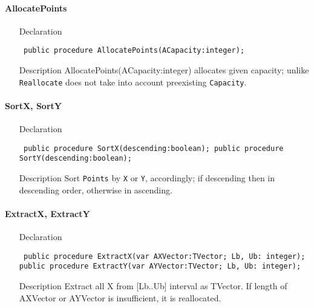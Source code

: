 \documentclass[12pt,a4paper,oneside]{report}
\newcommand{\declarationitem}[1]{{\addfontfeatures{FakeBold=1.3} #1}}
\newcommand{\descriptiontitle}[1]{{\addfontfeatures{FakeSlant}#1}}
\newcommand{\code}[1]{\texttt{#1}}
\begin{document}
\paragraph{AllocatePoints}\hspace*{\fill}

\label{lmPointsVec.TPoints-AllocatePoints}
\begin{itemize}\item[\declarationitem{Declaration}\hfill]
	\begin{flushleft}
		\code{
			public procedure AllocatePoints(ACapacity:integer);}
		
	\end{flushleft}
	
	\par
	\item[\descriptiontitle{Description}]
	AllocatePoints(ACapacity:integer) allocates given capacity; unlike \code{Reallocate} does not take into account preexisting \code{Capacity}.
	
\end{itemize}
\paragraph{SortX, SortY}\hspace*{\fill}

\label{lmPointsVec.TPoints-SortX}
\begin{itemize}\item[\declarationitem{Declaration}\hfill]
	\begin{flushleft}
		\code{
			public procedure SortX(descending:boolean);
			public procedure SortY(descending:boolean);}
	\end{flushleft}
	
	\par
	\item[\descriptiontitle{Description}]
	Sort \code{Points} by \code{X} or \code{Y}, accordingly; if descending then in descending order, otherwise in ascending.
\end{itemize}
\paragraph{ExtractX, ExtractY}\hspace*{\fill}

\label{lmPointsVec.TPoints-ExtractX}
\begin{itemize}\item[\declarationitem{Declaration}\hfill]
	\begin{flushleft}
		\code{
			public procedure ExtractX(var AXVector:TVector; Lb, Ub: integer);
			public procedure ExtractY(var AYVector:TVector; Lb, Ub: integer);}
	\end{flushleft}

	\item[\descriptiontitle{Description}]
	Extract all X from [Lb..Ub] interval as TVector. If length of AXVector or AYVector is insufficient, it is reallocated. 
\end{itemize}
\end{document}
